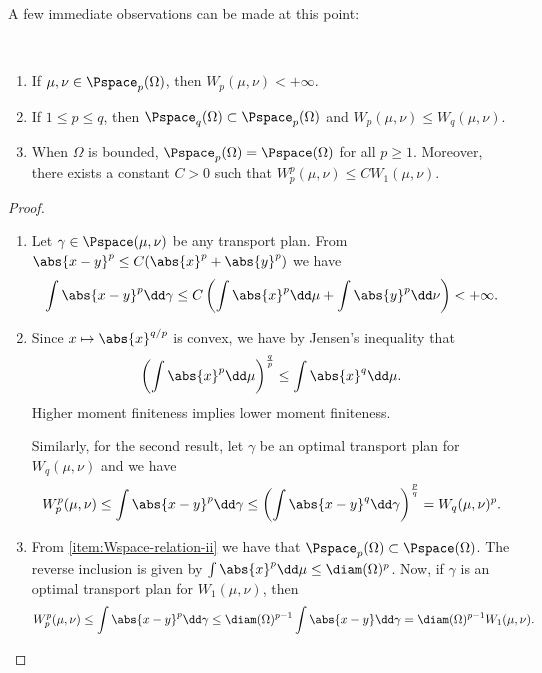 \documentclass[oneside,reqno,letterpaper]{amsart}
\begin{document}
A few immediate observations can be made at this point:
\begin{proposition}~
  \begin{enumerate}[label=(\roman*)]
    \item If \(\mu, \nu \in \Pspace_p(\Omega)\), then \(W_p(\mu, \nu) < +\infty\).
    \item\label{item:Wspace-relation-ii} If \(1 \leq p \leq q\), then \(\Pspace_q(\Omega) \subset \Pspace_p(\Omega)\) and \(W_p(\mu, \nu) \leq W_q(\mu, \nu)\).
    \item When \(\Omega\) is bounded, \(\Pspace_p(\Omega) = \Pspace(\Omega)\) for all \(p \geq 1\).
      Moreover, there exists a constant \(C > 0\) such that \(W_p^p(\mu, \nu) \leq C W_1(\mu, \nu)\).
  \end{enumerate}
\end{proposition}
\begin{proof}~
  \begin{enumerate}[label=(\roman*)]
    \item Let \(\gamma \in \Pspace(\mu, \nu)\) be any transport plan.
      From \(\abs{x - y}^p \leq C (\abs{x}^p + \abs{y}^p)\) we have
      \[
        \int \abs{x - y}^p \dd \gamma
        \leq C \left( \int \abs{x}^p \dd \mu + \int \abs{y}^p \dd \nu \right)
        < +\infty.
      \]
      \item Since \(x \mapsto \abs{x}^{q / p}\) is convex, we have by Jensen's inequality that
        \[
          \left( \int \abs{x}^p \dd \mu \right)^{\frac{q}{p}}
          \leq \int \abs{x}^q \dd \mu.
        \]
        Higher moment finiteness implies lower moment finiteness.

        Similarly, for the second result, let \(\gamma\) be an optimal transport plan for \(W_q(\mu, \nu)\) and we have
        \[
          W_p^p(\mu, \nu)
          \leq \int \abs{x - y}^p \dd \gamma
          \leq \left( \int \abs{x - y}^q \dd \gamma \right)^{\frac{p}{q}}
          = W_q(\mu, \nu)^p.
        \]
      \item From \ref{item:Wspace-relation-ii} we have that \(\Pspace_p(\Omega) \subset \Pspace(\Omega)\).
        The reverse inclusion is given by \(\int \abs{x}^p \dd \mu \leq \diam(\Omega)^p\).
        Now, if \(\gamma\) is an optimal transport plan for \(W_1(\mu, \nu)\), then
        \[
          W_p^p(\mu, \nu)
          \leq \int \abs{x - y}^p \dd \gamma
          \leq \diam(\Omega)^{p - 1} \int \abs{x - y} \dd \gamma
          = \diam(\Omega)^{p - 1} W_1(\mu, \nu).
        \]
  \end{enumerate}
\end{proof}
\end{document}
